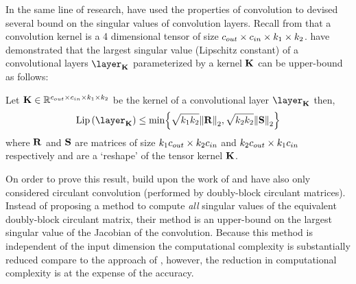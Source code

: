 In the same line of research, \citet{singla2019bounding} have used the properties of convolution to devised several bound on the singular values of convolution layers.
Recall from  that a convolution kernel is a 4 dimensional tensor of size $c_{out} \times c_{in} \times k_1 \times k_2$.
\citet{singla2019bounding} have demonstrated that the largest singular value (Lipschitz constant) of a convolutional layers $\layer_\Kmat$ parameterized by a kernel $\mathbf{K}$ can be upper-bound as follows:

\begin{theorem}
  Let $\mathbf{K} \in \mathbb{R}^{c_{out} \times c_{in} \times k_1 \times k_2}$ be the kernel of a convolutional layer $\layer_\Kmat$ then,  
  \begin{equation}
    \lip{\layer_\Kmat} \leq \min \left\{ \sqrt{k_1 k_2} \norm{\Rmat}_2, \sqrt{k_2 k_2} \norm{\Smat}_2 \right\}
  \end{equation}
  where $\mathbf{R}$ and $\mathbf{S}$ are matrices of size $k_1 c_{out} \times k_2 c_{in}$ and $k_2 c_{out} \times k_1 c_{in}$ respectively and are a `reshape' of the tensor kernel $\mathbf{K}$.
\end{theorem}


On order to prove this result, \citet{singla2019bounding} build upon the work of \citet{sedghi2018singular} and have also only considered circulant convolution (performed by doubly-block circulant matrices).
Instead of proposing a method to compute \emph{all} singular values of the equivalent doubly-block circulant matrix, their method is an upper-bound on the largest singular value of the Jacobian of the convolution. 
Because this method is independent of the input dimension the computational complexity is substantially reduced compare to the approach of \citet{sedghi2018singular}, however, the reduction in computational complexity is at the expense of the accuracy.
 








